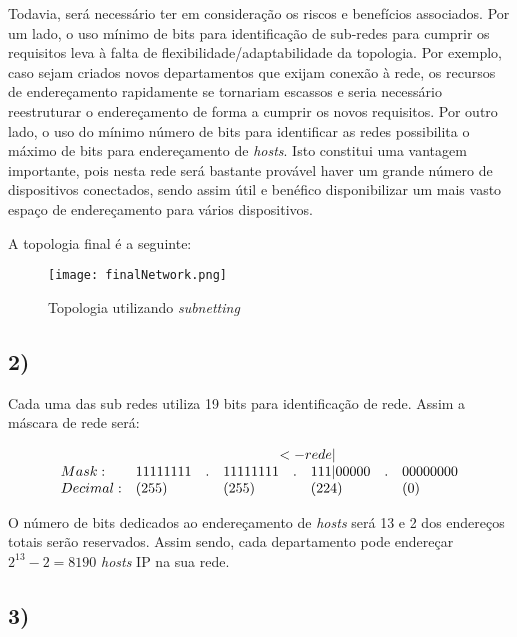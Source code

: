 \documentclass{llncs}
\begin{document}
Todavia, será necessário ter em consideração os riscos e benefícios associados. Por um lado, o uso mínimo de bits para identificação de sub-redes para cumprir os requisitos leva à falta de flexibilidade/adaptabilidade da topologia. Por exemplo, caso sejam criados novos departamentos que exijam conexão à rede, os recursos de endereçamento rapidamente se tornariam escassos e seria necessário reestruturar o endereçamento de forma a cumprir os novos requisitos. Por outro lado, o uso do mínimo número de bits para identificar as redes possibilita o máximo de bits para endereçamento de \textit{hosts}. Isto constitui uma vantagem importante, pois nesta rede será bastante provável haver um grande número de dispositivos conectados, sendo assim útil e benéfico disponibilizar um mais vasto espaço de endereçamento para vários dispositivos.

\newpage

A topologia final é a seguinte:

\begin{figure}[!ht]
	\begin{center}
		\texttt{[image: finalNetwork.png]}
		\caption{Topologia utilizando \textit{subnetting}}
	\end{center}
\end{figure}

\subsection*{2)}

Cada uma das sub redes utiliza 19 bits para identificação de rede. Assim a máscara de rede será:

\[
\begin{array}{l l l l l l l l l l l}
&&&&& \hspace*{-2.25em}<-rede| \\
Mask:&11111111&.&11111111&.&111|00000&.&00000000 \\
Decimal: & (255)&&(255)&&(224)&&(0)
\end{array}
\]

 O número de bits dedicados ao endereçamento de \textit{hosts} será 13 e 2 dos endereços totais serão reservados. Assim sendo, cada departamento pode endereçar $2^{13} - 2 = 8190$ \textit{hosts} IP na sua rede.

\newpage

\subsection*{3)}
\end{document}
